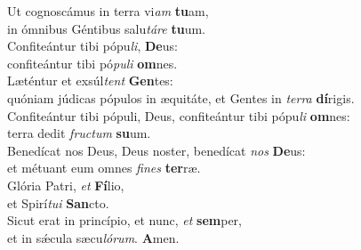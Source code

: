 \evenverse Ut cognoscámus in terra vi\textit{am} \textbf{tu}am,~\*\\
\evenverse in ómnibus Géntibus salu\textit{tá}\textit{re} \textbf{tu}um.\\
\oddverse Confiteántur tibi pópu\textit{li}, \textbf{De}us:~\*\\
\oddverse confiteántur tibi pó\textit{pu}\textit{li} \textbf{om}nes.\\
\evenverse Læténtur et exsúl\textit{tent} \textbf{Gen}tes:~\*\\
\evenverse quóniam júdicas pópulos in æquitáte, et Gentes in \textit{ter}\textit{ra} \textbf{dí}rigis.\\
\oddverse Confiteántur tibi pópuli, Deus, confiteántur tibi pópu\textit{li} \textbf{om}nes:~\*\\
\oddverse terra dedit \textit{fru}\textit{ctum} \textbf{su}um.\\
\evenverse Benedícat nos Deus, Deus noster, benedícat \textit{nos} \textbf{De}us:~\*\\
\evenverse et métuant eum omnes \textit{fi}\textit{nes} \textbf{ter}ræ.\\
\oddverse Glória Patri, \textit{et} \textbf{Fí}lio,~\*\\
\oddverse et Spirí\textit{tu}\textit{i} \textbf{San}cto.\\
\evenverse Sicut erat in princípio, et nunc, \textit{et} \textbf{sem}per,~\*\\
\evenverse et in sǽcula sæcu\textit{ló}\textit{rum}. \textbf{A}men.\\
